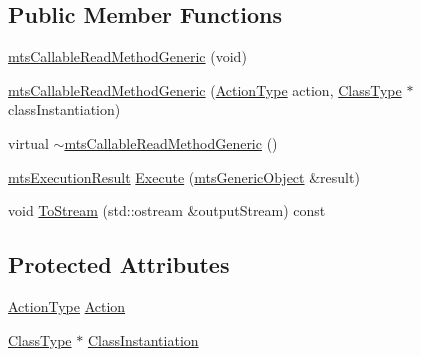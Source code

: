 \subsection*{Public Member Functions}
\begin{DoxyCompactItemize}
\item 
\hyperlink{classmts_callable_read_method_generic_a7c144d5960ed81dca3fcb832f4f93075}{mts\-Callable\-Read\-Method\-Generic} (void)
\item 
\hyperlink{classmts_callable_read_method_generic_afb63b9256c99d419bf008fe8e90afc87}{mts\-Callable\-Read\-Method\-Generic} (\hyperlink{classmts_callable_read_method_generic_adb570e75fc2af331a2cc2b8e6104b959}{Action\-Type} action, \hyperlink{classmts_callable_read_method_generic_afa0ef401d0f5538af2f0fe114ad9202d}{Class\-Type} $\ast$class\-Instantiation)
\item 
virtual \hyperlink{classmts_callable_read_method_generic_a1fec0dfdfb8bb6ce918071d1d5011aaa}{$\sim$mts\-Callable\-Read\-Method\-Generic} ()
\item 
\hyperlink{classmts_execution_result}{mts\-Execution\-Result} \hyperlink{classmts_callable_read_method_generic_a2c37de960f723c477637f1d79e3ae7c5}{Execute} (\hyperlink{classmts_generic_object}{mts\-Generic\-Object} \&result)
\item 
void \hyperlink{classmts_callable_read_method_generic_af15dcc735815a28319e6aeaa7564785f}{To\-Stream} (std\-::ostream \&output\-Stream) const 
\end{DoxyCompactItemize}
\subsection*{Protected Attributes}
\begin{DoxyCompactItemize}
\item 
\hyperlink{classmts_callable_read_method_generic_adb570e75fc2af331a2cc2b8e6104b959}{Action\-Type} \hyperlink{classmts_callable_read_method_generic_a68e6410f6fc38a56009ac9c6bab0ac68}{Action}
\item 
\hyperlink{classmts_callable_read_method_generic_afa0ef401d0f5538af2f0fe114ad9202d}{Class\-Type} $\ast$ \hyperlink{classmts_callable_read_method_generic_a78aa69ee0ab2f0c1120a4320c1315507}{Class\-Instantiation}
\end{DoxyCompactItemize}


